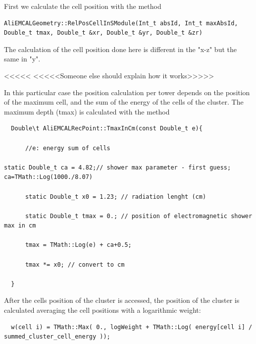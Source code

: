 First we calculate the cell position with the  method 

\begin{DDbox}{\linewidth}
\begin{lstlisting}
AliEMCALGeometry::RelPosCellInSModule(Int_t absId, Int_t maxAbsId, Double_t tmax, Double_t &xr, Double_t &yr, Double_t &zr)
\end{lstlisting}
\end{DDbox}

The calculation of the cell position done here is different in the "x-z" but the same in "y". 

 

{\color{red}<<<<< <<<<<Someone else should explain how it works>>>>>}

 
 

In this particular case the position calculation per tower depends on the position of the maximum cell, and the sum of the energy of the cells of the cluster. The maximum depth (tmax) is calculated with the method

\begin{DDbox}{\linewidth}
\begin{lstlisting}
  Double\t AliEMCALRecPoint::TmaxInCm(const Double_t e){

      //e: energy sum of cells

static Double_t ca = 4.82;// shower max parameter - first guess; ca=TMath::Log(1000./8.07)

      static Double_t x0 = 1.23; // radiation lenght (cm)

      static Double_t tmax = 0.; // position of electromagnetic shower max in cm

      tmax = TMath::Log(e) + ca+0.5;

      tmax *= x0; // convert to cm

  }
\end{lstlisting}
\end{DDbox}

After the cells position of the cluster is accessed, the position of the cluster is calculated averaging the cell positions with a logarithmic weight:

\begin{DDbox}{\linewidth}
\begin{lstlisting}
  w(cell i) = TMath::Max( 0., logWeight + TMath::Log( energy[cell i] / summed_cluster_cell_energy ));
\end{lstlisting}
\end{DDbox}

